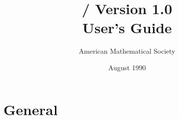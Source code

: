 \ifx\undefined\selectfont
\else
{}
\fi

\makeindex %



\newenvironment{filelist}{\par
  \addvspace{\medskipamount}\hrule\nobreak\addvspace{\medskipamount}\noindent
  \begin{tabular*}{\columnwidth}[t]{p{7pc}@{\extracolsep{\fill}}p{20pc}}}%
{\end{tabular*}\par}


\begin{titlepage}
\pagestyle{empty}
\title{\amslatex/ Version 1.0\\User's Guide}
\author{American Mathematical Society}
\date{August 1990}
\maketitle
\end{titlepage}

\tableofcontents

\newpage {}
\part{General}
